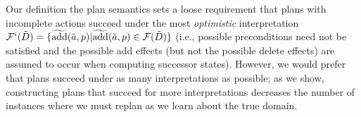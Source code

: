 \documentclass{article}
\begin{document}

  


%
%

Our definition the plan semantics sets a loose requirement that plans with incomplete actions succeed under the most  {\em optimistic} interpretation ${\cal F}^i(\tilde{D}) = \{ \widetilde{\text{add}}(\tilde{a}, p) | \widetilde{\text{add}}(\tilde{a}, p) \in {\cal F}(\tilde{D})\}$ (i.e., possible preconditions need not be satisfied and the possible add effects (but not the possible delete effects) are assumed to occur when computing successor states).   However, we would prefer that plans succeed under as many interpretations as possible; as we show, constructing plans that succeed for more interpretations decreases the number of instances where we must replan as we learn about the true domain.


\end{document}
